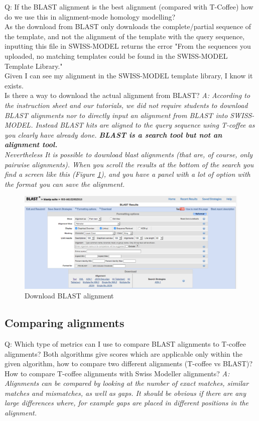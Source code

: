 \documentclass[10pt,a4paper]{article}
\begin{document}
Q: If the BLAST alignment is the best alignment (compared with T-Coffee) how do we use this in alignment-mode homology modelling? \\
As the download from BLAST only downloads the complete/partial sequence of the template, and not the alignment of the template with the query sequence, inputting this file in SWISS-MODEL returns the error "From the sequences you uploaded, no matching templates could be found in the SWISS-MODEL Template Library." \\
Given I can see my alignment in the SWISS-MODEL template library, I know it exists. \\
Is there a way to download the actual alignment from BLAST? \newline
\textit{A: According to the instruction sheet and our tutorials, we did not require students to download BLAST alignments nor to directly input an alignment from BLAST into SWISS-MODEL. Instead BLAST hits are aligned to the query sequence using T-coffee as you clearly have already done. \textbf{BLAST is a search tool but not an alignment tool.} \\
Nevertheless It is possible to download blast alignments (that are, of course, only pairwise alignments). When you scroll the results at the bottom of the search you find a screen like this (Figure \ref{figure:blastDl}), and you have a panel with a lot of option with the format you can save the alignment.} \newline
\begin{figure}[!ht]
\centering \includegraphics[width=\textwidth]{blast_dl.png}
\caption{Download BLAST alignment}
\label{figure:blastDl}
\end{figure}


\subsection{Comparing alignments}
Q: Which type of metrics can I use to compare BLAST alignments to T-coffee alignments? Both algorithms give scores which are applicable only within the given algorithm, how to compare two different alignments (T-coffee vs BLAST)? \newline
How to compare T-coffee alignments with Swiss Modeller alignments? \newline
\textit{A: Alignments can be compared by looking at the number of exact matches, similar matches and mismatches, as well as gaps. It should be obvious if there are any large differences where, for example gaps are placed in different positions in the alignment. } \newline
\end{document}
